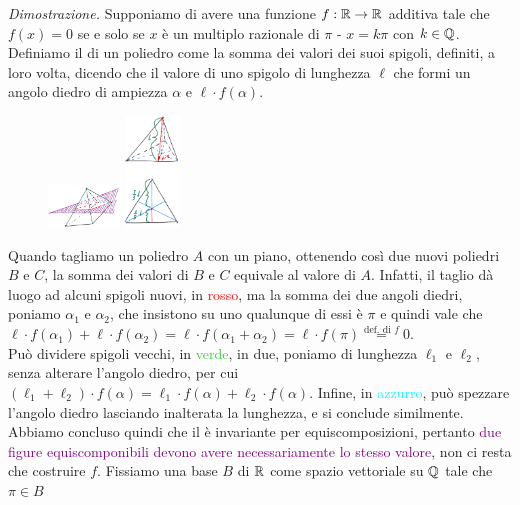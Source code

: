 \hspace{-0.43cm}\emph{Dimostrazione.} Supponiamo di avere una funzione $f : \mathbb R \to \mathbb R$ additiva tale che $f(x) = 0$ se e solo se $x$ è un multiplo razionale di $\pi$ - $x = k\pi$ con $k \in \mathbb Q$.\\
	Definiamo il  di un poliedro come la somma dei valori dei suoi spigoli, definiti, a loro volta, dicendo che il valore di uno spigolo di lunghezza $\ell$ che formi un angolo diedro di ampiezza $\alpha$ e $\ell \cdot f(\alpha)$.\\
	\begin{figure}
		\includegraphics[width=0.17\textwidth]{immagini/cubo_tetraedro.png}
		\hspace{-0.2cm} \includegraphics[width=0.13\textwidth]{immagini/angolo_diedro.png}
	\end{figure}
	Quando tagliamo un poliedro $A$ con un piano, ottenendo così due nuovi poliedri $B$ e $C$, la somma dei valori di $B$ e $C$ equivale al valore di $A$. Infatti, il taglio dà luogo ad alcuni spigoli nuovi, in \textcolor{red}{rosso}, ma la somma dei due angoli 
	diedri, poniamo $\alpha_1$ e $\alpha_2$, che insistono su uno qualunque di essi è $\pi$ e quindi vale che $\ell \cdot f(\alpha_1) + \ell \cdot f(\alpha_2) = \ell \cdot f(\alpha_1 + \alpha_2) = \ell \cdot f(\pi) \overset{\text{def. di $f$}}{=} 0$.\\
	Può dividere spigoli vecchi, in \textcolor{LimeGreen}{verde}, in due,
	poniamo di lunghezza $\ell_1$ e $\ell_2$, senza alterare l'angolo diedro, per cui $(\ell_1 + \ell_2) \cdot f(\alpha) = \ell_1 \cdot f(\alpha) + \ell_2 \cdot f(\alpha)$. Infine, in \textcolor{cyan}{azzurro}, può spezzare l'angolo diedro lasciando inalterata la lunghezza, e si conclude similmente.\\
	Abbiamo concluso quindi che il  è invariante per equiscomposizioni, pertanto \textcolor{purple}{due figure equiscomponibili devono avere necessariamente lo stesso valore}, non ci resta che costruire $f$. Fissiamo una base $B$ di $\mathbb R$ come spazio vettoriale su $\mathbb Q$ tale che $\pi \in B$
